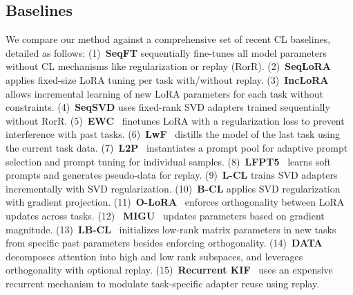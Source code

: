 \subsection{Baselines}
\label{app:baselines}
We compare our method against a comprehensive set of recent CL baselines, detailed as follows:
(1)~\textbf{SeqFT} sequentially fine-tunes all model parameters without CL mechanisms like regularization or replay (RorR). 
(2)~\textbf{SeqLoRA} applies fixed-size LoRA tuning per task with/without replay.  
(3)~\textbf{IncLoRA} allows incremental learning of new LoRA
parameters for each task without constraints.  
(4)~\textbf{SeqSVD} uses fixed-rank SVD adapters trained sequentially without RorR.   
(5)~\textbf{EWC}~\cite{kirkpatrick2017overcoming} finetunes LoRA with
a regularization loss to prevent interference with past tasks.  
(6)~\textbf{LwF}~\cite{li2017learning} distills the model of
the last task using the current task data.  
(7)~\textbf{L2P}~\cite{wang2022learning} instantiates a prompt pool for adaptive prompt selection and prompt tuning for individual samples.  
(8)~\textbf{LFPT5}~\cite{qin2021lfpt5} learns soft prompts and generates pseudo-data for replay.  
(9)~\textbf{L-CL} trains SVD adapters incrementally with SVD regularization.  
(10)~\textbf{B-CL} applies SVD regularization with gradient projection.  
(11)~\textbf{O-LoRA}~\cite{wang2023orthogonal} enforces orthogonality between LoRA updates across tasks. 
(12) ~\textbf{MIGU}~\cite{du2024unlocking} updates parameters based on gradient magnitude.
(13)~\textbf{LB-CL}~\cite{qiao2024learn} initializes low-rank matrix parameters in
new tasks from specific past parameters besides enforcing orthogonality.  
(14)~\textbf{DATA}~\cite{liao2025data} decomposes attention into high and low rank subspaces, and leverages orthogonality with optional replay.  
(15)~\textbf{Recurrent KIF}~\cite{feng2025recurrent} uses an expensive recurrent mechanism to modulate task-specific adapter reuse using replay.
